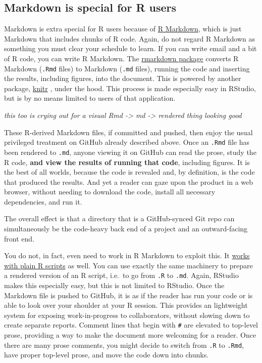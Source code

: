 \documentclass[12pt]{article}
\begin{document}
\subsection{Markdown is special for R
users}\label{markdown-is-special-for-r-users}

Markdown is extra special for R users because of
\href{http://rmarkdown.rstudio.com}{R Markdown}, which is just Markdown
that includes chunks of R code. Again, do not regard R Markdown as
something you must clear your schedule to learn. If you can write email
and a bit of R code, you can write R Markdown. The
\href{https://CRAN.R-project.org/package=rmarkdown}{rmarkdown package}
\citep{rmd-pkg} converts R Markdown (\texttt{.Rmd} files) to Markdown
(\texttt{.md} files), running the code and inserting the results,
including figures, into the document. This is powered by another
package, \href{https://CRAN.R-project.org/package=knitr}{knitr}
\citep{knitr-pkg, knitr-book}, under the hood. This process is made
especially easy in RStudio, but is by no means limited to users of that
application.

\emph{this too is crying out for a visual Rmd -\textgreater{} md
-\textgreater{} rendered thing looking good}

These R-derived Markdown files, if committed and pushed, then enjoy the
usual privileged treatment on GitHub already described above. Once an
\texttt{.Rmd} file has been rendered to \texttt{.md}, anyone viewing it
on GitHub can read the prose, study the R code, \textbf{and view the
results of running that code}, including figures. It is the best of all
worlds, because the code is revealed and, by definition, is the code
that produced the results. And yet a reader can gaze upon the product in
a web browser, without needing to download the code, install all
necessary dependencies, and run it.

The overall effect is that a directory that is a GitHub-synced Git repo
can simultaneously be the code-heavy back end of a project and an
outward-facing front end.

You do not, in fact, even need to work in R Markdown to exploit this. It
\href{http://rmarkdown.rstudio.com/articles_report_from_r_script.html}{works
with plain R scripts} as well. You can use exactly the same machinery to
prepare a rendered version of an R script, i.e.~to go from \texttt{.R}
to \texttt{.md}. Again, RStudio makes this especially easy, but this is
not limited to RStudio. Once the Markdown file is pushed to GitHub, it
is as if the reader has run your code or is able to look over your
shoulder at your R session. This provides an lightweight system for
exposing work-in-progress to collaborators, without slowing down to
create separate reports. Comment lines that begin with
\texttt{\#\textquotesingle{}} are elevated to top-level prose, providing
a way to make the document more welcoming for a reader. Once there are
many prose comments, you might decide to switch from \texttt{.R} to
\texttt{.Rmd}, have proper top-level prose, and move the code down into
chunks.
\end{document}
